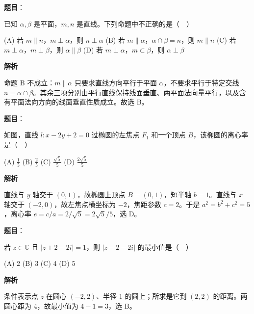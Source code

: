 \begin{answer}

\textbf{题目}：

已知 \(\alpha,\beta\) 是平面，\(m,n\) 是直线。下列命题中不正确的是（　）

    (A) 若 \(m\parallel n\)，\(m\perp\alpha\)，则 \(n\perp\alpha\)
    (B) 若 \(m\parallel\alpha\)，\(\alpha\cap\beta=n\)，则 \(m\parallel n\)
    (C) 若 \(m\perp\alpha\)，\(m\perp\beta\)，则 \(\alpha\parallel\beta\)
    (D) 若 \(m\perp\alpha\)，\(m\subset\beta\)，则 \(\alpha\perp\beta\)

\textbf{解析}

命题 B 不成立：\(m\parallel\alpha\) 只要求直线方向平行于平面 \(\alpha\)，不要求平行于特定交线 \(n=\alpha\cap\beta\)。其余三项分别由平行直线保持线面垂直、两平面法向量平行，以及含有平面法向方向的线面垂直性质成立。故选 B。


\end{answer}
\begin{answer}

\textbf{题目}：

如图，直线 \(l:x-2y+2=0\) 过椭圆的左焦点 \(F_1\) 和一个顶点 \(B\)，该椭圆的离心率是（　）

    (A) \(\frac15\)
    (B) \(\frac25\)
    (C) \(\frac{\sqrt5}{5}\)
    (D) \(\frac{2\sqrt5}{5}\)
\nopagebreak[4]
\begin{center}\end{center}
\nopagebreak[4]
\textbf{解析}

直线与 \(y\) 轴交于 \((0,1)\)，故椭圆上顶点 \(B=(0,1)\)，短半轴 \(b=1\)。直线与 \(x\) 轴交于 \((-2,0)\)，故左焦点横坐标为 \(-2\)，焦距参数 \(c=2\)。于是 \(a^2=b^2+c^2=5\)，离心率 \(e=c/a=2/\sqrt5=2\sqrt5/5\)，选 D。


\end{answer}
\begin{answer}

\textbf{题目}：

若 \(z\in\mathbb C\) 且 \(|z+2-2i|=1\)，则 \(|z-2-2i|\) 的最小值是（　）

    (A) 2
    (B) 3
    (C) 4
    (D) 5

\textbf{解析}

条件表示点 \(z\) 在圆心 \((-2,2)\)、半径 1 的圆上；所求是它到 \((2,2)\) 的距离。两圆心距为 4，故最小值为 \(4-1=3\)，选 B。


\end{answer}
